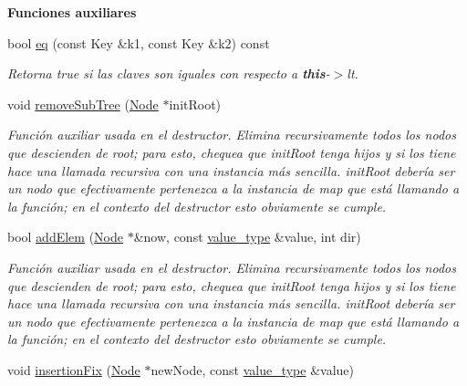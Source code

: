 \begin{Indent}\textbf{ Funciones auxiliares}\par
\begin{DoxyCompactItemize}
\item 
bool \hyperlink{classaed2_1_1map_aebf6c09c424c39a874798165401b309e_aebf6c09c424c39a874798165401b309e}{eq} (const Key \&k1, const Key \&k2) const
\begin{DoxyCompactList}\small\item\em Retorna true si las claves son iguales con respecto a {\bfseries this}-\/$>$lt. \end{DoxyCompactList}\item 
void \hyperlink{classaed2_1_1map_a533bd88d0b7a584e3c968548d246c255_a533bd88d0b7a584e3c968548d246c255}{remove\+Sub\+Tree} (\hyperlink{structaed2_1_1map_1_1Node}{Node} $\ast$init\+Root)
\begin{DoxyCompactList}\small\item\em Función auxiliar usada en el destructor. Elimina recursivamente todos los nodos que descienden de root; para esto, chequea que init\+Root tenga hijos y si los tiene hace una llamada recursiva con una instancia más sencilla. init\+Root debería ser un nodo que efectivamente pertenezca a la instancia de map que está llamando a la función; en el contexto del destructor esto obviamente se cumple. \end{DoxyCompactList}\item 
bool \hyperlink{classaed2_1_1map_a709e1a06ac3c5932c1eb6d9741f37b2c_a709e1a06ac3c5932c1eb6d9741f37b2c}{add\+Elem} (\hyperlink{structaed2_1_1map_1_1Node}{Node} $\ast$\&now, const \hyperlink{classaed2_1_1map_a719db98e0ff9a837610f76be33264680_a719db98e0ff9a837610f76be33264680}{value\+\_\+type} \&value, int dir)
\begin{DoxyCompactList}\small\item\em Función auxiliar usada en el destructor. Elimina recursivamente todos los nodos que descienden de root; para esto, chequea que init\+Root tenga hijos y si los tiene hace una llamada recursiva con una instancia más sencilla. init\+Root debería ser un nodo que efectivamente pertenezca a la instancia de map que está llamando a la función; en el contexto del destructor esto obviamente se cumple. \end{DoxyCompactList}\item 
void \hyperlink{classaed2_1_1map_abe3f47a745e17a6327943b813ff6bfb3_abe3f47a745e17a6327943b813ff6bfb3}{insertion\+Fix} (\hyperlink{structaed2_1_1map_1_1Node}{Node} $\ast$new\+Node, const \hyperlink{classaed2_1_1map_a719db98e0ff9a837610f76be33264680_a719db98e0ff9a837610f76be33264680}{value\+\_\+type} \&value)

\end{DoxyCompactItemize}
\end{Indent}
